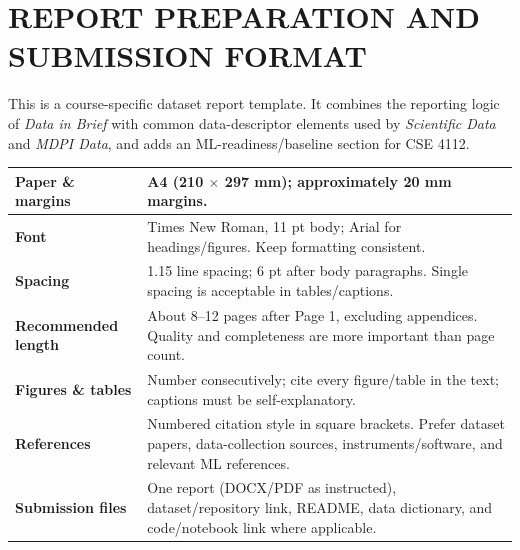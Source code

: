\documentclass[11pt,a4paper]{article}
\begin{document}
\section*{REPORT PREPARATION AND SUBMISSION FORMAT}
This is a course-specific dataset report template. It combines the reporting logic of \textit{Data in Brief} with common data-descriptor elements used by \textit{Scientific Data} and \textit{MDPI Data}, and adds an ML-readiness/baseline section for CSE 4112.

\vspace{0.5em}

\noindent
\begin{tabularx}{\textwidth}{|p{4.0cm}|X|}
\hline
\textbf{Paper \& margins} & A4 (210 $\times$ 297 mm); approximately 20 mm margins. \\
\hline
\textbf{Font} & Times New Roman, 11 pt body; Arial for headings/figures. Keep formatting consistent. \\
\hline
\textbf{Spacing} & 1.15 line spacing; 6 pt after body paragraphs. Single spacing is acceptable in tables/captions. \\
\hline
\textbf{Recommended length} & About 8–12 pages after Page 1, excluding appendices. Quality and completeness are more important than page count. \\
\hline
\textbf{Figures \& tables} & Number consecutively; cite every figure/table in the text; captions must be self-explanatory. \\
\hline
\textbf{References} & Numbered citation style in square brackets. Prefer dataset papers, data-collection sources, instruments/software, and relevant ML references. \\
\hline
\textbf{Submission files} & One report (DOCX/PDF as instructed), dataset/repository link, README, data dictionary, and code/notebook link where applicable. \\
\hline
\end{tabularx}

\vspace{1.5em}

\end{document}
